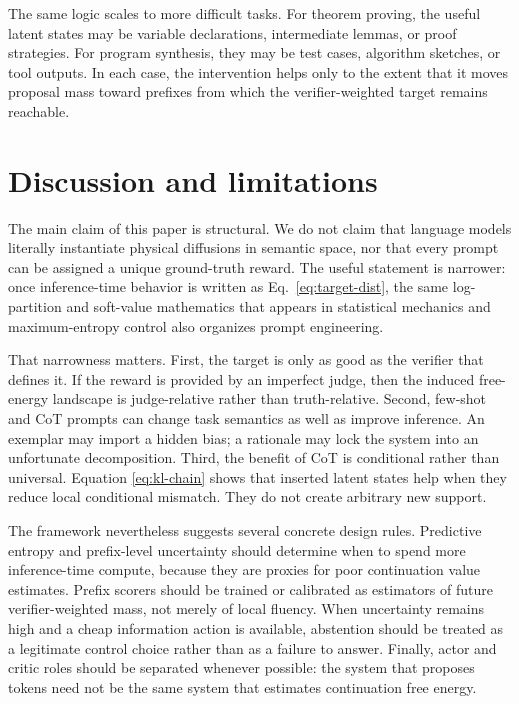\documentclass[aps,pre,reprint,superscriptaddress,nofootinbib]{revtex4-2}
\begin{document}
The same logic scales to more difficult tasks.
 For theorem proving, the useful latent states may be variable declarations, intermediate lemmas, or proof strategies.
 For program synthesis, they may be test cases, algorithm sketches, or tool outputs.
 In each case, the intervention helps only to the extent that it moves proposal mass toward prefixes from which the verifier-weighted target remains reachable.

\section{Discussion and limitations}

The main claim of this paper is structural.
 We do not claim that language models literally instantiate physical diffusions in semantic space, nor that every prompt can be assigned a unique ground-truth reward.
 The useful statement is narrower: once inference-time behavior is written as Eq.~\eqref{eq:target-dist}, the same log-partition and soft-value mathematics that appears in statistical mechanics and maximum-entropy control also organizes prompt engineering.

That narrowness matters.
 First, the target is only as good as the verifier that defines it.
 If the reward is provided by an imperfect judge, then the induced free-energy landscape is judge-relative rather than truth-relative.
 Second, few-shot and CoT prompts can change task semantics as well as improve inference.
 An exemplar may import a hidden bias; a rationale may lock the system into an unfortunate decomposition.
 Third, the benefit of CoT is conditional rather than universal.
 Equation \eqref{eq:kl-chain} shows that inserted latent states help when they reduce local conditional mismatch.
 They do not create arbitrary new support.

The framework nevertheless suggests several concrete design rules.
 Predictive entropy and prefix-level uncertainty should determine when to spend more inference-time compute, because they are proxies for poor continuation value estimates.
 Prefix scorers should be trained or calibrated as estimators of future verifier-weighted mass, not merely of local fluency.
 When uncertainty remains high and a cheap information action is available, abstention should be treated as a legitimate control choice rather than as a failure to answer.
 Finally, actor and critic roles should be separated whenever possible: the system that proposes tokens need not be the same system that estimates continuation free energy.
\end{document}
